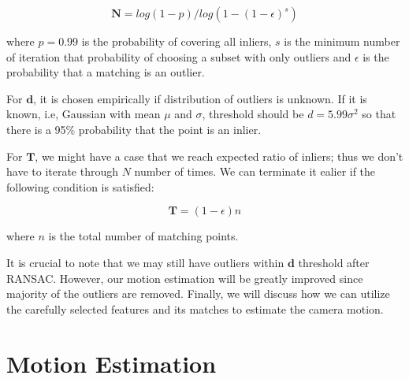 \documentclass[a4paper]{report}
\numberwithin{figure}{section}
\begin{document}
\begin{equation}
  \mathbf{N} = log(1-p)/log(1-(1-\epsilon)^s)
\end{equation}

where $p=0.99$ is the probability of covering all inliers, $s$ is the 
minimum number of iteration that 
probability of choosing a subset with only outliers 
and $\epsilon$ is the probability that a matching is an outlier.

For $\mathbf{d}$, it is chosen empirically if distribution of outliers is unknown. If 
it is known, i.e, Gaussian with mean $\mu$ and $\sigma$, threshold should 
be $d=5.99\sigma^2$ so that there is a 95\% probability that the point is an inlier.

For $\mathbf{T}$, we might have a case that we reach expected ratio of inliers; thus 
we don't have to iterate through $N$ number of times. We can terminate it 
ealier if the following condition is satisfied:

\begin{equation}
  \mathbf{T} = (1-\epsilon)n
\end{equation}

where $n$ is the total number of matching points.

It is crucial 
to note that we may still have outliers within $\mathbf{d}$ threshold after 
RANSAC.
However, 
our motion estimation will be greatly improved since 
majority of the outliers are removed.
Finally, we will discuss how we can utilize the carefully selected features 
and its matches to estimate the camera motion.


\section{Motion Estimation} \label{sc_motion_estim}
\end{document}

